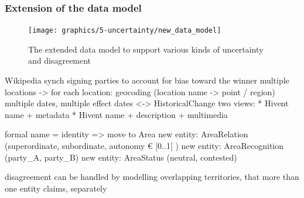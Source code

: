 
\subsubsection{Extension of the data model} %
\label{ssub:extension_of_the_data_model}


\begin{figure}[ht]
  \centering
  \texttt{[image: graphics/5-uncertainty/new\_data\_model]}
  \caption{The extended data model to support various kinds of uncertainty and disagreement}
  \label{fig:new_data_model}
\end{figure}


Wikipedia synch
signing parties to account for bias toward the winner
multiple locations
-> for each location: geocoding (location name -> point / region)
multiple dates, multiple effect dates <-> HistoricalChange
two views:
* Hivent name + metadata
* Hivent name + description + multimedia


formal name = identity => move to Area
new entity: AreaRelation    (superordinate, subordinate, autonomy € [0..1[ )
new entity: AreaRecognition (party\_A, party\_B)
new entity: AreaStatus      (neutral, contested)

disagreement can be handled by modelling overlapping territories, that more than one entity claims, separately





